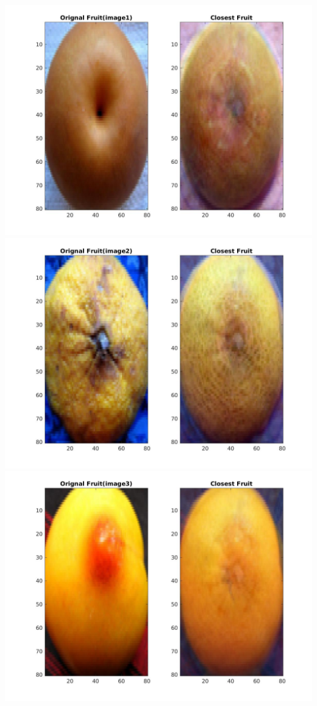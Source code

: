 \documentclass[12pt, a4paper]{article}
\begin{document}
\includegraphics[width=\textwidth, height = 0.25\paperheight]{Closest_fruit_analysis_1}
\includegraphics[width=\textwidth, height = 0.25\paperheight]{Closest_fruit_analysis_2}
\includegraphics[width=\textwidth, height = 0.25\paperheight]{Closest_fruit_analysis_3}
\end{document}
